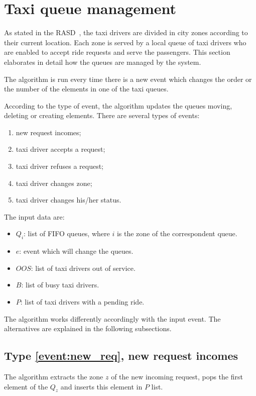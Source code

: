 \section{Taxi queue management}
As stated in the RASD~\cite{rasd}, the taxi drivers are divided in city zones according to their current location. Each zone is served by a local queue of taxi drivers who are enabled to accept ride requests and serve the passengers. This section elaborates in detail how the queues are managed by the system.

The algorithm is run every time there is a new event which changes the order or the number of the elements in one of the taxi queues.

According to the type of event, the algorithm updates the queues moving, deleting or creating elements. There are several types of events:
\begin{enumerate}
	\item new request incomes; \label{event:new_req}
	\item taxi driver accepts a request; \label{event:accepted_req}
	\item taxi driver refuses a request; \label{event:refuses_req}
	\item taxi driver changes zone; \label{event:changed_zone}
	\item taxi driver changes his/her status. \label{event:changed_status}
\end{enumerate}
The input data are:
\begin{itemize}
	\item $Q_i$: list of FIFO queues, where $i$ is the zone of the correspondent queue.
	\item $e$: event which will change the queues.
	\item $OOS$: list of taxi drivers out of service.
	\item $B$: list of busy taxi drivers.
	\item $P$: list of taxi drivers with a pending ride.
\end{itemize}

The algorithm works differently accordingly with the input event. The alternatives are explained in the following subsections.

\subsection{Type \ref{event:new_req}, new request incomes}
The algorithm extracts the zone $z$ of the new incoming request, pops the first element of the $Q_z$ and inserts this element in $P$ list.

